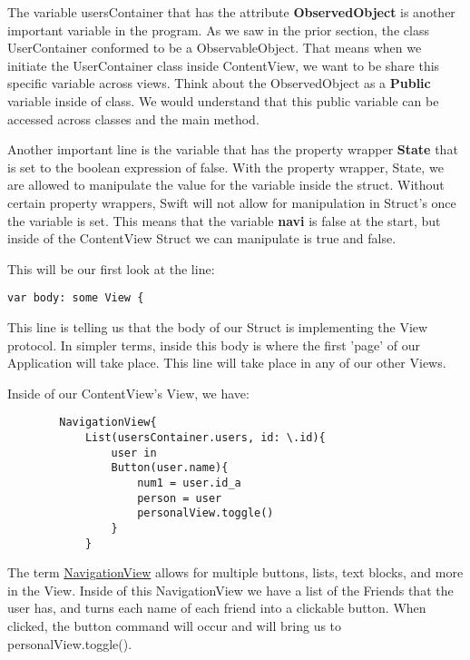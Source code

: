 \documentclass{article}
\theoremstyle{theorem}
\theoremstyle{definition}
\theoremstyle{remark}
\begin{document}
\noindent\newline The variable usersContainer that has the attribute \textbf{ObservedObject} is another important variable in the program. As we saw in the prior section, the class UserContainer conformed to be a ObservableObject. That means when we initiate the UserContainer class inside ContentView, we want to be share this specific variable across views. Think about the ObservedObject as a \textbf{Public} variable inside of class. We would understand that this public variable can be accessed across classes and the main method. 

\noindent\newline Another important line is the variable that has the property wrapper \textbf{State} that is set to the boolean expression of false. With the property wrapper, State, we are allowed to manipulate the value for the variable inside the struct. Without certain property wrappers, Swift will not allow for manipulation in Struct's once the variable is set. This means that the variable \textbf{navi} is false at the start, but inside of the ContentView Struct we can manipulate is true and false.

\noindent\newline This will be our first look at the line:
\begin{verbatim}
var body: some View {
\end{verbatim}
\noindent\newline This line is telling us that the body of our Struct is implementing the View protocol. In simpler terms, inside this body is where the first 'page' of our Application will take place. This line will take place in any of our other Views.

\noindent\newline Inside of our ContentView's View, we have:
\begin{verbatim}
        NavigationView{
            List(usersContainer.users, id: \.id){
                user in
                Button(user.name){
                    num1 = user.id_a
                    person = user
                    personalView.toggle()
                }
            }
\end{verbatim}
\noindent\newline The term \href{https://bignerdranch.com/blog/the-different-forms-of-navigation-in-swiftui/}{NavigationView} allows for multiple buttons, lists, text blocks, and more in the View. Inside of this NavigationView we have a list of the Friends that the user has, and turns each name of each friend into a clickable button. When clicked, the button command will occur and will bring us to personalView.toggle().
\end{document}
